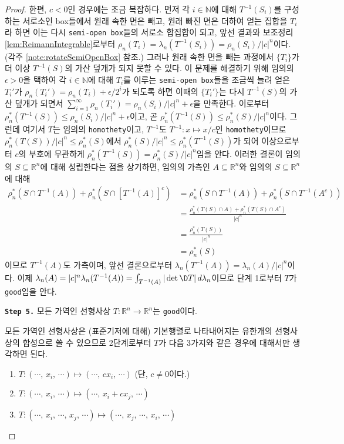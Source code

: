 \begin{proof}
    한편, $c<0$인 경우에는 조금 복잡하다. 먼저 각 $i\in\mathbb{N}$에 대해 $T^{-1}(S_i)$를 구성하는 서로소인 box들에서 원래 속한 면은 빼고, 원래 빠진 면은 더하여 얻는 집합을 $T_i$라 하면 이는 다시 \texttt{semi-open box}들의 서로소 합집합이 되고, 앞선 결과와 보조정리 \ref{lem:ReimannIntegrable}로부터 $\rho_n(T_i)=\lambda_n(T^{-1}(S_i))=\rho_n(S_i)/|c|^n$이다. (각주 \ref{note:rotateSemiOpenBox} 참조.) 그러나 원래 속한 면을 빼는 과정에서 $\{T_i\}$가 더 이상 $T^{-1}(S)$의 가산 덮개가 되지 못할 수 있다. 이 문제를 해결하기 위해 임의의 $\epsilon>0$을 택하여 각 $i\in\mathbb{N}$에 대해 $T_i$를 이루는 \texttt{semi-open box}들을 조금씩 늘려 얻은 $T_i'$가 $\rho_n(T_i')=\rho_n(T_i)+\epsilon/2^i$가 되도록 하면 이때의 $\{T_i'\}$는 다시 $T^{-1}(S)$의 가산 덮개가 되면서 $\sum_{i=1}^\infty\rho_n(T_i')=\rho_n(S_i)/|c|^n+\epsilon$을 만족한다. 이로부터 $\rho_n^*(T^{-1}(S))\leq\rho_n(S_i)/|c|^n+\epsilon$이고, 곧 $\rho_n^*(T^{-1}(S))\leq\rho_n^*(S)/|c|^n$이다. 그런데 여기서 $T$는 임의의 \texttt{homothety}이고, $T^{-1}$도 $T^{-1}:x\mapsto x/c$인 \texttt{homothety}이므로 $\rho_n^*(T(S))/|c|^n\leq\rho_n^*(S)$에서 $\rho_n^*(S)/|c|^n\leq\rho_n^*(T^{-1}(S))$가 되어 이상으로부터 $c$의 부호에 무관하게 $\rho_n^*(T^{-1}(S))=\rho_n^*(S)/|c|^n$임을 안다. 이러한 결론이 임의의 $S\subseteq\mathbb{R}^n$에 대해 성립한다는 점을 상기하면, 임의의 가측인 $A\subseteq\mathbb{R}^n$와 임의의 $S\subseteq\mathbb{R}^n$에 대해
    \begin{align*}
        \rho_n^*(S\cap T^{-1}(A))+\rho_n^*(S\cap [T^{-1}(A)]^c)&=\rho_n^*(S\cap T^{-1}(A))+\rho_n^*(S\cap T^{-1}(A^c))\\
        &=\frac{\rho_n^*(T(S)\cap A)+\rho_n^*(T(S)\cap A^c)}{|c|^n}\\
        &=\frac{\rho_n^*(T(S))}{|c|^n}\\
        &=\rho_n^*(S)
    \end{align*}
    이므로 $T^{-1}(A)$도 가측이며, 앞선 결론으로부터 $\lambda_n(T^{-1}(A))=\lambda_n(A)/|c|^n$이다. 이제 $\lambda_n(A)=|c|^n\lambda_n(T^{-1}(A))=\int_{T^{-1}(A)}|\det\D T|\,d\lambda_n$이므로 단계 1로부터 $T$가 \texttt{good}임을 안다.

    \noindent\texttt{\textbf{Step 5.}} 모든 가역인 선형사상 $T:\mathbb{R}^n\to\mathbb{R}^n$는 \texttt{good}이다.

    모든 가역인 선형사상은 (표준기저에 대해) 기본행렬로 나타내어지는 유한개의 선형사상의 합성으로 쓸 수 있으므로 2단계로부터 $T$가 다음 3가지와 같은 경우에 대해서만 생각하면 된다.
    \begin{enumerate}
        \item $T:(\cdots,\,x_i,\,\cdots)\mapsto(\cdots,\,cx_i,\,\cdots)$ (단, $c\ne0$이다.)
        \item $T:(\cdots,\,x_i,\,\cdots)\mapsto(\cdots,\,x_i+cx_j,\,\cdots)$
        \item $T:(\cdots,\,x_i,\,\cdots,\,x_j,\,\cdots)\mapsto(\cdots,\,x_j,\,\cdots,\,x_i,\,\cdots)$
    \end{enumerate}


\end{proof}
